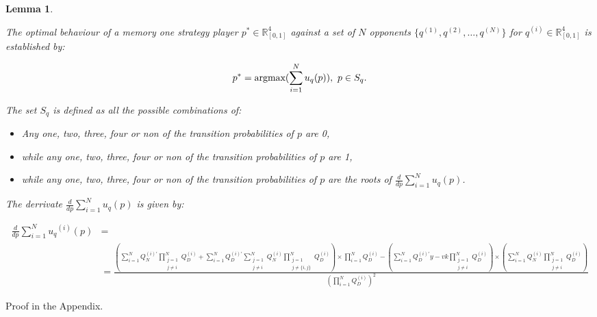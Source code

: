 \documentclass[10pt]{article}
\newcommand{\R}{\mathbb{R}}
\newtheorem{lemma}[theorem]{Lemma}
\begin{document}
\begin{lemma}\label{lemma:memone_group_best_response}

    The optimal behaviour of a memory one strategy player
    \(p^* \in \R_{[0, 1]} ^ 4\)
    against a set of \(N\) opponents \(\{q^{(1)}, q^{(2)}, \dots, q^{(N)} \}\)
    for \(q^{(i)} \in \R_{[0, 1]} ^ 4\) is established by:

    \[p^* = \textnormal{argmax}(\sum\limits_{i=1} ^ N  u_q(p)), \ p \in S_q.\]

    The set \(S_q\) is defined as all the possible combinations of:

    \begin{itemize}
    \item Any one, two, three, four or non of the transition probabilities of
    \(p\) are 0,
    \item while any one, two, three, four or non of the transition probabilities of
    \(p\) are 1,
    \item while any one, two, three, four or non of the transition probabilities of
    \(p\) are the roots of \(\frac{d}{dp} \sum\limits_{i=1} ^ N  u_q(p)\).
    \end{itemize}

    The derrivate \(\frac{d}{dp} \sum\limits_{i=1} ^ N  u_q(p)\) is given by:

    {\scriptsize
    \begin{align}\label{eq:mo_tournament_derivative}
        \frac{d}{dp} \sum\limits_{i=1} ^ {N} {u_q}^{(i)} (p) & = \nonumber \\
        & =\frac{
        (\sum\limits_{i=1} ^ {N} Q_{N}^{(i)'} \prod_{\substack{j=1 \\ j \neq i}} ^ N Q_{D}^{(i)}
        + \sum\limits_{i=1} ^ {N} Q_{D}^{(i)'} \sum_{\substack{j=1 \\ j \neq i}} ^ {N} Q_{N}^{(i)}
       \prod_{\substack{j=1 \\ j \neq \{i, j\}}} ^ N Q_{D}^{(i)}) \times
       \prod\limits_{i=1} ^ N Q_{D}^{(i)} - (\sum\limits_{i=1} ^ {N} Q_{D}^{(i)'}y-vk
       \prod_{\substack{j=1 \\ j \neq i}} ^ N Q_{D}^{(i)}) \times
       (\sum\limits_{i=1} ^ {N} Q_{N}^{(i)} \prod_{\substack{j=1 \\ j \neq i}} ^ N Q_{D}^{(i)})}
        {(\prod\limits_{i=1} ^ N Q_{D}^{(i)})^{2}}
    \end{align}
    }
\end{lemma}

Proof in the Appendix.
\end{document}

